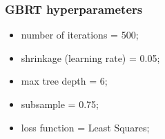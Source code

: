 \documentclass{beamer}
\begin{document}

\begin{frame}
    \frametitle{GBRT hyperparameters}
    \begin{itemize}
        \item \alert{number of iterations  = 500; }
        \item \alert{shrinkage (learning rate) = 0.05; }
        \item max tree depth = 6; 
        \item subsample = 0.75; 
        \item loss function = Least Squares; 
    \end{itemize}
    \vspace{1cm}
     \qquad
\end{frame}
\end{document}
